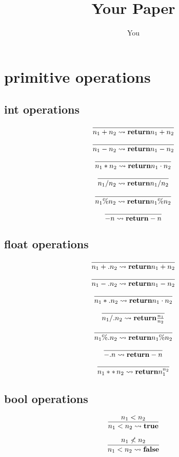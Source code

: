 \documentclass{article}
\title{Your Paper}
\author{You}
\begin{document}
\maketitle

\section{primitive operations}

\subsection{int operations}

\[\infer{ n_1+n_2 \leadsto \mathbf{return} n_1+n_2}{}\]

\[\infer{ n_1-n_2 \leadsto \mathbf{return} n_1-n_2}{}\]

\[\infer{ n_1*n_2 \leadsto \mathbf{return} n_1\cdot n_2}{}\]

\[\infer{ n_1/n_2 \leadsto \mathbf{return} n_1/n_2}{}\]

\[\infer{ n_1 \% n_2 \leadsto \mathbf{return} n_1\%n_2}{}\]

\[\infer{ -n \leadsto \mathbf{return} -n}{} \]

\subsection{float operations}

\[\infer{ n_1+.n_2 \leadsto \mathbf{return} n_1+n_2}{}\]

\[\infer{ n_1-.n_2 \leadsto \mathbf{return} n_1-n_2}{}\]

\[\infer{ n_1*.n_2 \leadsto \mathbf{return} n_1\cdot n_2}{}\]

\[\infer{ n_1/.n_2 \leadsto \mathbf{return} \frac{n_1}{n_2}}{}\]

\[\infer{ n_1 \%. n_2 \leadsto \mathbf{return} n_1 \% n_2}{}\]

\[\infer{ -.n \leadsto \mathbf{return} -n}{} \]

\[\infer{ n_1 **\, n_2 \leadsto \mathbf{return} n_1^{n_2}}{}\]

\subsection{bool operations}

\[\infer{ n_1 < n_2 \leadsto \mathbf{true}}{n_1 < n_2}\]

\[\infer{ n_1 < n_2 \leadsto \mathbf{false}}{n_1 \nless n_2}\]
\end{document}
